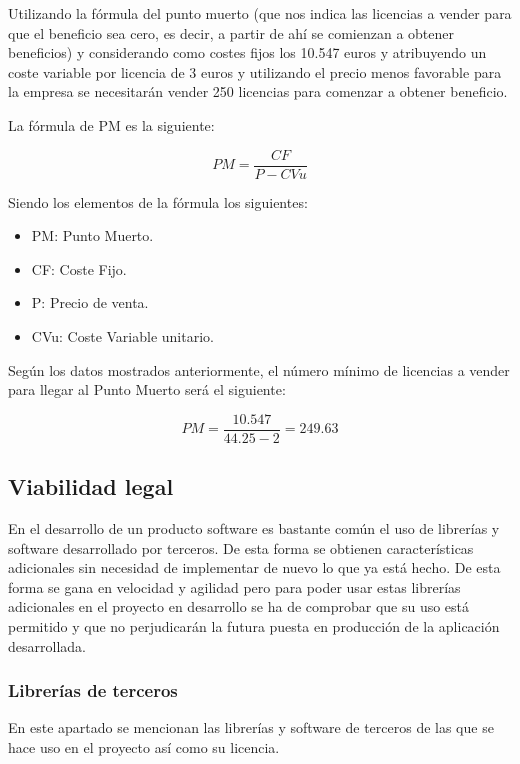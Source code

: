Utilizando la fórmula del punto muerto (que nos indica las licencias a vender para que el beneficio sea cero, es decir, a partir de ahí se comienzan a obtener beneficios) y considerando como costes fijos los 10.547 euros y atribuyendo un coste variable por licencia de 3 euros y utilizando el precio menos favorable para la empresa se necesitarán vender 250 licencias para comenzar a obtener beneficio.

La fórmula de PM es la siguiente:

\begin{equation*}
 	PM = \frac{CF}{P - CVu}
\end{equation*}

Siendo los elementos de la fórmula los siguientes:

\begin{itemize}
	\item PM: Punto Muerto.
	\item CF: Coste Fijo.
	\item P: Precio de venta.
	\item CVu: Coste Variable unitario.
\end{itemize}

Según los datos mostrados anteriormente, el número mínimo de licencias a vender para llegar al Punto Muerto será el siguiente:

\begin{equation*}
 	PM = \frac{10.547}{44.25 - 2} = 249.63
\end{equation*}

\subsection{Viabilidad legal}

En el desarrollo de un producto software es bastante común el uso de librerías y software desarrollado por terceros. De esta forma se obtienen características adicionales sin necesidad de implementar de nuevo lo que ya está hecho. De esta forma se gana en velocidad y agilidad pero para poder usar estas librerías adicionales en el proyecto en desarrollo se ha de comprobar que su uso está permitido y que no perjudicarán la futura puesta en producción de la aplicación desarrollada.

\subsubsection{Librerías de terceros}
En este apartado se mencionan las librerías y software de terceros de las que se hace uso en el proyecto así como su licencia.


